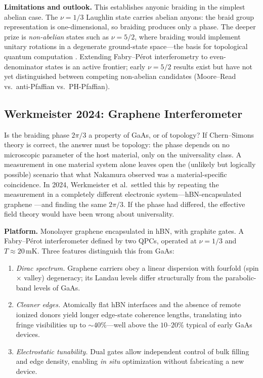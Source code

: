 \medskip
\noindent\textbf{Limitations and outlook.}
This establishes anyonic braiding in the simplest abelian case.  The $\nu = 1/3$ Laughlin state carries abelian anyons: the braid group representation is one-dimensional, so braiding produces only a phase.  The deeper prize is \emph{non-abelian} states such as $\nu = 5/2$, where braiding would implement unitary rotations in a degenerate ground-state space---the basis for topological quantum computation \cite{NayakSimonSternFreedmanDasSarma2008NonabelianAnyons}.  Extending Fabry--P\'erot interferometry to even-denominator states is an active frontier; early $\nu = 5/2$ results exist but have not yet distinguished between competing non-abelian candidates (Moore--Read vs.\ anti-Pfaffian vs.\ PH-Pfaffian).

\subsection{Werkmeister 2024: Graphene Interferometer}
\label{subsec:werkmeister-2024}

Is the braiding phase $2\pi/3$ a property of GaAs, or of topology?  If Chern--Simons theory is correct, the answer must be topology: the phase depends on no microscopic parameter of the host material, only on the universality class.  A measurement in one material system alone leaves open the (unlikely but logically possible) scenario that what Nakamura observed was a material-specific coincidence.  In 2024, Werkmeister et al.\ settled this by repeating the measurement in a completely different electronic system---hBN-encapsulated graphene \cite{Werkmeister2024GrapheneInterferometer}---and finding the same $2\pi/3$.  If the phase had differed, the effective field theory would have been wrong about universality.

\medskip
\noindent\textbf{Platform.}
Monolayer graphene encapsulated in hBN, with graphite gates.  A Fabry--P\'erot interferometer defined by two QPCs, operated at $\nu = 1/3$ and $T \approx 20\,\text{mK}$.  Three features distinguish this from GaAs:
\begin{enumerate}
  \item \emph{Dirac spectrum.}  Graphene carriers obey a linear dispersion with fourfold (spin $\times$ valley) degeneracy; its Landau levels differ structurally from the parabolic-band levels of GaAs.
  \item \emph{Cleaner edges.}  Atomically flat hBN interfaces and the absence of remote ionized donors yield longer edge-state coherence lengths, translating into fringe visibilities up to $\sim 40\%$---well above the $10$--$20\%$ typical of early GaAs devices.
  \item \emph{Electrostatic tunability.}  Dual gates allow independent control of bulk filling and edge density, enabling \emph{in situ} optimization without fabricating a new device.
\end{enumerate}

